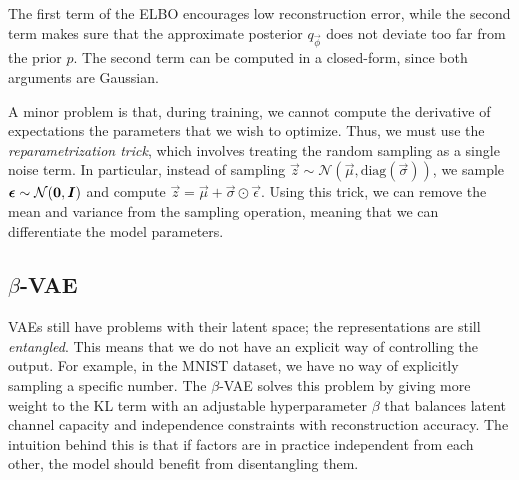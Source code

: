 The first term of the ELBO encourages low reconstruction error, while the second term makes sure that
the approximate posterior $q_{\vec{\phi}}$ does not deviate too far from the prior $p$. The second
term can be computed in a closed-form, since both arguments are Gaussian.

A minor problem is that, during training, we cannot compute the derivative of expectations \wrt the
parameters that we wish to optimize. Thus, we must use the \textit{reparametrization trick}, which
involves treating the random sampling as a single noise term. In particular, instead of sampling
$\vec{z} \sim \mathcal{N}(\vec{\mu}, \mathrm{diag}(\vec{\sigma}))$, we sample $\bm{\epsilon} \sim
    \mathcal{N}(\bm{0},\bm{I})$ and compute $\vec{z} = \vec{\mu} + \vec{\sigma} \odot
    \vec{\epsilon}$. Using this trick, we can remove the mean and variance from the sampling operation,
meaning that we can differentiate \wrt the model parameters.

\subsection{$\beta$-VAE}

VAEs still have problems with their latent space; the representations are still \textit{entangled}.
This means that we do not have an explicit way of controlling the output. For example, in the MNIST
dataset, we have no way of explicitly sampling a specific number. The $\beta$-VAE solves this
problem by giving more weight to the KL term with an adjustable hyperparameter $\beta$ that
balances latent channel capacity and independence constraints with reconstruction accuracy. The
intuition behind this is that if factors are in practice independent from each other, the model
should benefit from disentangling them.

